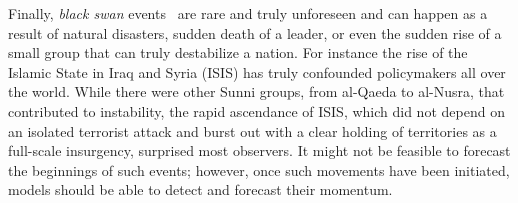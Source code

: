 Finally, {\it black swan} events~\cite{taleb-book} are rare and truly unforeseen and can happen as a 
result of natural disasters, sudden death of a leader, or even the sudden rise of a 
small group that can truly destabilize a nation.  For instance the rise of the
Islamic State in Iraq and Syria (ISIS) has truly confounded policymakers all over the world.  
While there were other Sunni groups, from al-Qaeda to al-Nusra, that contributed to
instability, the rapid ascendance of ISIS, which did not depend on an isolated terrorist attack and 
burst out with a clear holding of territories as a full-scale insurgency, surprised most observers.   
It might not be feasible to forecast the beginnings of such events; however, once such movements
have been initiated, models should be able to detect and forecast their momentum.  



